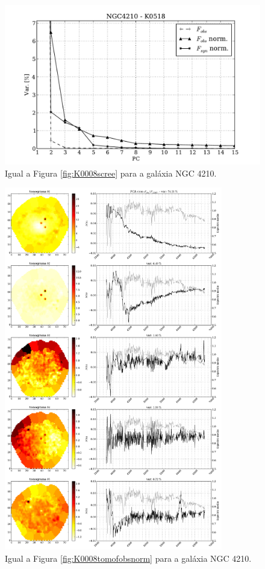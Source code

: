 \begin{figure}
    \includegraphics[height=0.33\textheight]{figuras/K0518-screetest.pdf}
    \caption[Scree test comparativo entre 3 PCAs - NGC 4210.]
	{Igual a Figura \ref{fig:K0008scree} para a galáxia NGC 4210.}
    \label{fig:K00518scree}
\end{figure}

\begin{figure}
    \includegraphics[width=0.85\textwidth]{figuras/K0518-tomo-obs-norm.pdf}
    \caption[Tomogramas de 1 a 5 para o cubo $F_{obs}$ norm. - NGC 4210.]
    {Igual a Figura \ref{fig:K0008tomofobsnorm} para a galáxia NGC 4210.}
    \label{fig:K0518tomofobsnorm}
\end{figure}

